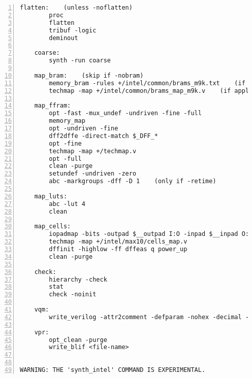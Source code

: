 \begin{lstlisting}[numbers=left,frame=single]
    flatten:    (unless -noflatten)
        proc
        flatten
        tribuf -logic
        deminout

    coarse:
        synth -run coarse

    map_bram:    (skip if -nobram)
        memory_bram -rules +/intel/common/brams_m9k.txt    (if applicable for family)
        techmap -map +/intel/common/brams_map_m9k.v    (if applicable for family)

    map_ffram:
        opt -fast -mux_undef -undriven -fine -full
        memory_map
        opt -undriven -fine
        dff2dffe -direct-match $_DFF_*
        opt -fine
        techmap -map +/techmap.v
        opt -full
        clean -purge
        setundef -undriven -zero
        abc -markgroups -dff -D 1    (only if -retime)

    map_luts:
        abc -lut 4
        clean

    map_cells:
        iopadmap -bits -outpad $__outpad I:O -inpad $__inpad O:I    (if -iopads)
        techmap -map +/intel/max10/cells_map.v
        dffinit -highlow -ff dffeas q power_up
        clean -purge

    check:
        hierarchy -check
        stat
        check -noinit

    vqm:
        write_verilog -attr2comment -defparam -nohex -decimal -renameprefix syn_ <file-name>

    vpr:
        opt_clean -purge
        write_blif <file-name>


WARNING: THE 'synth_intel' COMMAND IS EXPERIMENTAL.
\end{lstlisting}

